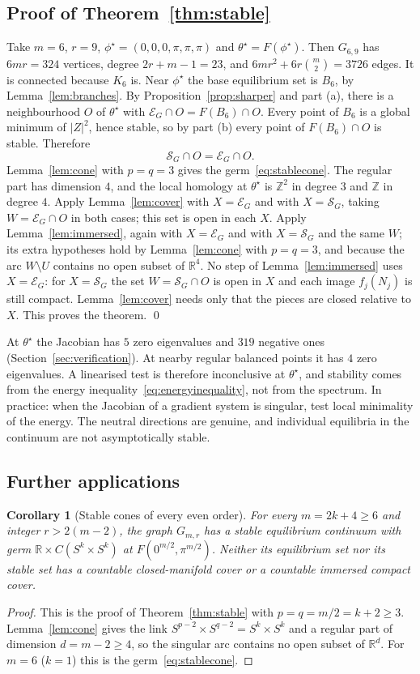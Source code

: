 \documentclass[11pt,a4paper]{article}
\newtheorem{corollary}[theorem]{Corollary}
\theoremstyle{definition}\newtheorem{conjecture}{Conjecture}
\theoremstyle{remark}\newtheorem{remark}[theorem]{Remark}
\newcommand{\R}{\mathbb R}
\newcommand{\Z}{\mathbb Z}
\newcommand{\E}{\mathcal E}
\newcommand{\Sset}{\mathcal S}
\begin{document}
\subsection{Proof of Theorem~\ref{thm:stable}}
Take $m=6$, $r=9$, $\phi^\star=(0,0,0,\pi,\pi,\pi)$ and $\theta^\star=F(\phi^\star)$. Then $G_{6,9}$ has $6mr=324$ vertices, degree $2r+m-1=23$, and $6mr^2+6r\binom m2=3726$ edges. It is connected because $K_6$ is. Near $\phi^\star$ the base equilibrium set is $B_6$, by Lemma~\ref{lem:branches}. By Proposition~\ref{prop:sharper} and part (a), there is a neighbourhood $O$ of $\theta^\star$ with $\E_G\cap O=F(B_6)\cap O$. Every point of $B_6$ is a global minimum of $|Z|^2$, hence stable, so by part (b) every point of $F(B_6)\cap O$ is stable. Therefore
\[
 \Sset_G\cap O=\E_G\cap O .
\]
Lemma~\ref{lem:cone} with $p=q=3$ gives the germ~\eqref{eq:stablecone}. The regular part has dimension $4$, and the local homology at $\theta^\star$ is $\Z^2$ in degree $3$ and $\Z$ in degree $4$. Apply Lemma~\ref{lem:cover} with $X=\E_G$ and with $X=\Sset_G$, taking $W=\E_G\cap O$ in both cases; this set is open in each $X$. Apply Lemma~\ref{lem:immersed}, again with $X=\E_G$ and with $X=\Sset_G$ and the same $W$; its extra hypotheses hold by Lemma~\ref{lem:cone} with $p=q=3$, and because the arc $W\setminus U$ contains no open subset of $\R^4$. No step of Lemma~\ref{lem:immersed} uses $X=\E_G$: for $X=\Sset_G$ the set $W=\Sset_G\cap O$ is open in $X$ and each image $f_j(N_j)$ is still compact. Lemma~\ref{lem:cover} needs only that the pieces are closed relative to $X$. This proves the theorem. \qed

At $\theta^\star$ the Jacobian has $5$ zero eigenvalues and $319$ negative ones (Section~\ref{sec:verification}). At nearby regular balanced points it has $4$ zero eigenvalues. A linearised test is therefore inconclusive at $\theta^\star$, and stability comes from the energy inequality~\eqref{eq:energyinequality}, not from the spectrum. In practice: when the Jacobian of a gradient system is singular, test local minimality of the energy. The neutral directions are genuine, and individual equilibria in the continuum are not asymptotically stable.

\subsection{Further applications}
\begin{corollary}[Stable cones of every even order]\label{cor:cones}
For every $m=2k+4\ge6$ and integer $r>2(m-2)$, the graph $G_{m,r}$ has a stable equilibrium continuum with germ $\R\times C(S^{k}\times S^{k})$ at $F(0^{m/2},\pi^{m/2})$. Neither its equilibrium set nor its stable set has a countable closed-manifold cover or a countable immersed compact cover.
\end{corollary}
\begin{proof}
This is the proof of Theorem~\ref{thm:stable} with $p=q=m/2=k+2\ge3$. Lemma~\ref{lem:cone} gives the link $S^{p-2}\times S^{q-2}=S^k\times S^k$ and a regular part of dimension $d=m-2\ge4$, so the singular arc contains no open subset of $\R^d$. For $m=6$ ($k=1$) this is the germ~\eqref{eq:stablecone}.
\end{proof}
\end{document}
